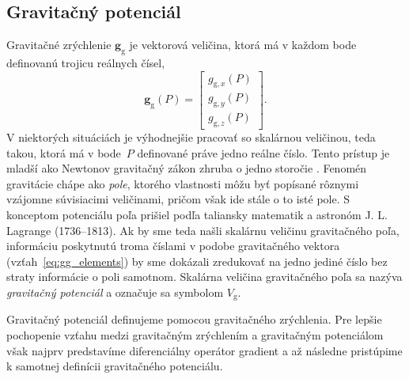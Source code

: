 \documentclass[a4paper, 12pt]{book}
\newcommand{\gidx}{\mathrm g}
\let\vec\mathbf
\begin{document}
\subsection{Gravitačný potenciál}
\label{sec:vg}

Gravitačné zrýchlenie $\vec g_\gidx$ je vektorová veličina, ktorá má v každom 
bode definovanú trojicu reálnych čísel,
%
\begin{equation}
\label{eq:gg_elements}
\vec g_{\gidx}(P) =
\begin{bmatrix}
g_{\gidx,x}(P) \\[2ex]
g_{\gidx,y}(P) \\[2ex]
g_{\gidx,z}(P)
\end{bmatrix}
{.}
\end{equation}
%
V niektorých situáciách je výhodnejšie pracovať so skalárnou veličinou, teda 
takou, ktorá má v bode~$P$ definované práve jedno reálne číslo.  Tento prístup 
je mladší ako Newtonov gravitačný zákon zhruba o jedno storočie 
\citep{MacMillan1930,Jekeli2015}.  Fenomén gravitácie chápe ako \emph{pole}, 
ktorého vlastnosti môžu byť popísané rôznymi vzájomne súvisiacimi veličinami, 
pričom však ide stále o to isté pole.  S konceptom potenciálu poľa prišiel 
podľa \cite{MacMillan1930} taliansky matematik a astronóm J. L. Lagrange 
(1736--1813).  Ak by sme teda našli skalárnu veličinu gravitačného poľa, 
informáciu poskytnutú troma číslami v podobe gravitačného vektora 
(vzťah~\ref{eq:gg_elements}) by sme dokázali zredukovať na jedno jediné číslo 
bez straty informácie o poli samotnom.  Skalárna veličina gravitačného poľa sa 
nazýva \emph{gravitačný potenciál} a označuje sa symbolom $V_\gidx$.

Gravitačný potenciál definujeme pomocou gravitačného zrýchlenia.  Pre lepšie 
pochopenie vzťahu medzi gravitačným zrýchlením a gravitačným potenciálom však 
najprv predstavíme diferenciálny operátor gradient a až následne pristúpime 
k samotnej definícii gravitačného potenciálu.
\end{document}
